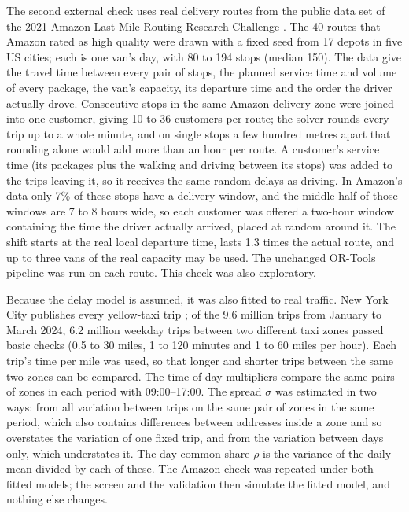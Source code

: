 \documentclass[12pt,letterpaper]{article}
\begin{document}
The second external check uses real delivery routes from the public data set of
the 2021 Amazon Last Mile Routing Research Challenge \cite{merchan2022}. The 40 routes
that Amazon rated as high quality were drawn with a fixed seed from
17 depots in five US cities; each is one van's day, with
80 to 194 stops (median 150). The data give the
travel time between every pair of stops, the planned service time and volume of
every package, the van's capacity, its departure time and the order the driver
actually drove. Consecutive stops in the same Amazon delivery zone were joined into
one customer, giving 10 to 36 customers per route; the
solver rounds every trip up to a whole minute, and on single stops a few hundred
metres apart that rounding alone would add more than an hour per route. A
customer's service time (its packages plus the walking and driving between its
stops) was added to the trips leaving it, so it receives the same random delays as
driving. In Amazon's data only 7\% of these stops have a delivery window,
and the middle half of those windows are 7 to 8 hours wide, so each customer was offered a two-hour window containing the time the
driver actually arrived, placed at random around it. The shift starts at the real
local departure time, lasts 1.3 times the actual route, and up to three vans of the
real capacity may be used. The unchanged OR-Tools pipeline was run on each route.
This check was also exploratory.

Because the delay model is assumed, it was also fitted to real traffic. New York
City publishes every yellow-taxi trip \cite{nyctlc2024}; of the 9.6 million
trips from January to March 2024, 6.2 million weekday trips between two
different taxi zones passed basic checks (0.5 to 30 miles, 1 to 120 minutes and 1
to 60 miles per hour). Each trip's time per mile was used, so that longer and
shorter trips between the same two zones can be compared. The time-of-day
multipliers compare the same pairs of zones in each period with 09:00--17:00. The
spread $\sigma$ was estimated in two ways: from all variation between trips on the
same pair of zones in the same period, which also contains differences between
addresses inside a zone and so overstates the variation of one fixed trip, and from
the variation between days only, which understates it. The day-common share $\rho$
is the variance of the daily mean divided by each of these. The Amazon check was
repeated under both fitted models; the screen and the validation then simulate the
fitted model, and nothing else changes.
\end{document}
